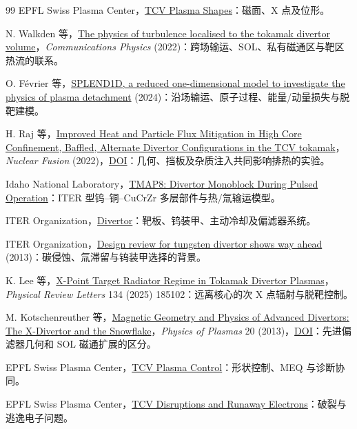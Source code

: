 \documentclass[12pt,fontset=none]{ctexart}
\numberwithin{equation}{section}
\numberwithin{table}{section}
\numberwithin{figure}{section}
\begin{document}
\begin{thebibliography}{99}
EPFL Swiss Plasma Center，\href{https://www.epfl.ch/research/domains/swiss-plasma-center/tcv-plasma-shapes/}{TCV Plasma Shapes}：磁面、X 点及位形。

N. Walkden 等，\href{https://doi.org/10.1038/s42005-022-00906-2}{The physics of turbulence localised to the tokamak divertor volume}，\textit{Communications Physics} (2022)：跨场输运、SOL、私有磁通区与靶区热流的联系。

O. F\'evrier 等，\href{https://arxiv.org/abs/2402.04656}{SPLEND1D, a reduced one-dimensional model to investigate the physics of plasma detachment} (2024)：沿场输运、原子过程、能量/动量损失与脱靶建模。

H. Raj 等，\href{https://arxiv.org/abs/2207.13305}{Improved Heat and Particle Flux Mitigation in High Core Confinement, Baffled, Alternate Divertor Configurations in the TCV tokamak}，\textit{Nuclear Fusion} (2022)，\href{https://doi.org/10.1088/1741-4326/ac94e5}{DOI}：几何、挡板及杂质注入共同影响排热的实验。

Idaho National Laboratory，\href{https://tmap8.inl.gov/examples/divertor_monoblock/}{TMAP8: Divertor Monoblock During Pulsed Operation}：ITER 型钨--铜--CuCrZr 多层部件与热/氚输运模型。

ITER Organization，\href{https://www.iter.org/machine/divertor}{Divertor}：靶板、钨装甲、主动冷却及偏滤器系统。

ITER Organization，\href{https://www.iter.org/node/20687/design-review-tungsten-divertor-shows-way-ahead}{Design review for tungsten divertor shows way ahead} (2013)：碳侵蚀、氚滞留与钨装甲选择的背景。

K. Lee 等，\href{https://doi.org/10.1103/PhysRevLett.134.185102}{X-Point Target Radiator Regime in Tokamak Divertor Plasmas}，\textit{Physical Review Letters} 134 (2025) 185102：远离核心的次 X 点辐射与脱靶控制。

M. Kotschenreuther 等，\href{https://arxiv.org/abs/1309.5289}{Magnetic Geometry and Physics of Advanced Divertors: The X-Divertor and the Snowflake}，\textit{Physics of Plasmas} 20 (2013)，\href{https://doi.org/10.1063/1.4824735}{DOI}：先进偏滤器几何和 SOL 磁通扩展的区分。

EPFL Swiss Plasma Center，\href{https://www.epfl.ch/research/domains/swiss-plasma-center/tcv-plasma-control/}{TCV Plasma Control}：形状控制、MEQ 与诊断协同。

EPFL Swiss Plasma Center，\href{https://www.epfl.ch/research/domains/swiss-plasma-center/tcv-disruptions-and-runaway-electrons/}{TCV Disruptions and Runaway Electrons}：破裂与逃逸电子问题。


\end{thebibliography}
\end{document}
